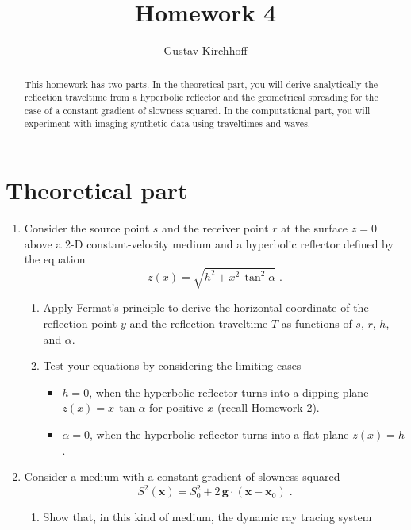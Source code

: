 \author{Gustav Kirchhoff} 
\title{Homework 4}

\begin{abstract}
  This homework has two parts. In the theoretical part, you will
  derive analytically the reflection traveltime from a hyperbolic
  reflector and the geometrical spreading for the case of a constant
  gradient of slowness squared.  In the computational part, you will
  experiment with imaging synthetic data using traveltimes and waves.
\end{abstract}

\section{Theoretical part}

\begin{enumerate}
\item Consider the source point $s$ and the receiver point $r$ at the
  surface $z=0$ above a 2-D constant-velocity medium and a hyperbolic
  reflector defined by the equation 
  \begin{equation}
    \label{eq:hyper}
    z(x) = \sqrt{h^2 +
      x^2\,\tan^2{\alpha}}\;.
  \end{equation}
  \begin{enumerate}
  \item Apply Fermat's principle to derive the horizontal coordinate of
    the reflection point $y$ and the reflection traveltime $T$ as 
    functions of $s$, $r$, $h$, and $\alpha$.
  \item Test your equations by considering the limiting cases
    \begin{itemize}
    \item $h=0$, 
      when the hyperbolic reflector turns into a dipping 
      plane $z(x)= x\,\tan{\alpha}$ for positive $x$ (recall Homework 2).
    \item $\alpha=0$,
      when the
      hyperbolic reflector turns into a flat plane $z(x)=h$.
    \end{itemize}
  \end{enumerate}
\item Consider a medium with a constant gradient of slowness squared
  \begin{equation}
    S^2(\mathbf{x}) = S_0^2 + 2\,\mathbf{g} \cdot (\mathbf{x}-\mathbf{x}_0)\;.
  \end{equation}
  \begin{enumerate}
  \item Show that, in this kind of medium, the dynamic ray tracing system

\end{enumerate}
\end{enumerate}
